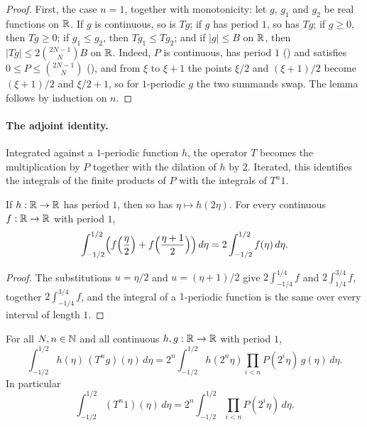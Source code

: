 \begin{proof}
\leanok
{}
First, the case $n = 1$, together with monotonicity: let $g$, $g_1$ and $g_2$ be real functions
on $\mathbb{R}$. If $g$ is continuous, so is $T g$; if $g$ has period $1$, so has $T g$; if $g \geq 0$,
then $T g \geq 0$; if $g_1 \leq g_2$, then $T g_1 \leq T g_2$; and if $|g| \leq B$ on $\mathbb{R}$, then
$|T g| \leq 2 \binom{2N-1}{N} B$ on $\mathbb{R}$. Indeed, $P$ is continuous, has period $1$
() and satisfies $0 \leq P \leq \binom{2N-1}{N}$
(), and from $\xi$ to $\xi + 1$ the points $\xi/2$ and $(\xi + 1)/2$
become $(\xi + 1)/2$ and $\xi/2 + 1$, so for $1$-periodic $g$ the two summands swap. The lemma
follows by induction on $n$.
\end{proof}

\paragraph{The adjoint identity.}
Integrated against a $1$-periodic function $h$, the operator $T$ becomes the multiplication by
$P$ together with the dilation of $h$ by $2$. Iterated, this identifies the integrals of the
finite products of $P$ with the integrals of $T^n 1$.

\begin{lemma}
\label{lem:daub-halving}
\leanok
If $h : \mathbb{R} \to \mathbb{R}$ has period $1$, then so has $\eta \mapsto h(2\eta)$. For every continuous
$f : \mathbb{R} \to \mathbb{R}$ with period $1$,
\[
  \int_{-1/2}^{1/2} \Bigl(f\Bigl(\frac{\eta}{2}\Bigr) + f\Bigl(\frac{\eta + 1}{2}\Bigr)\Bigr)
  \, d\eta = 2 \int_{-1/2}^{1/2} f(\eta) \, d\eta .
\]
\end{lemma}

\begin{proof}
\leanok
The substitutions $u = \eta/2$ and $u = (\eta + 1)/2$ give $2 \int_{-1/4}^{1/4} f$ and
$2 \int_{1/4}^{3/4} f$, together $2 \int_{-1/4}^{3/4} f$, and the integral of a $1$-periodic
function is the same over every interval of length $1$.
\end{proof}

\begin{proposition}
\label{prop:daub-transfer-iterates-adjoint}
\leanok
{}
For all $N, n \in \mathbb{N}$ and all continuous $h, g : \mathbb{R} \to \mathbb{R}$ with period $1$,
\[
  \int_{-1/2}^{1/2} h(\eta) \, (T^n g)(\eta) \, d\eta
  = 2^n \int_{-1/2}^{1/2} h(2^n \eta) \prod_{i<n} P(2^i \eta) \, g(\eta) \, d\eta .
\]
In particular
\[
  \int_{-1/2}^{1/2} (T^n 1)(\eta) \, d\eta
  = 2^n \int_{-1/2}^{1/2} \prod_{i<n} P(2^i \eta) \, d\eta .
\]
\end{proposition}

